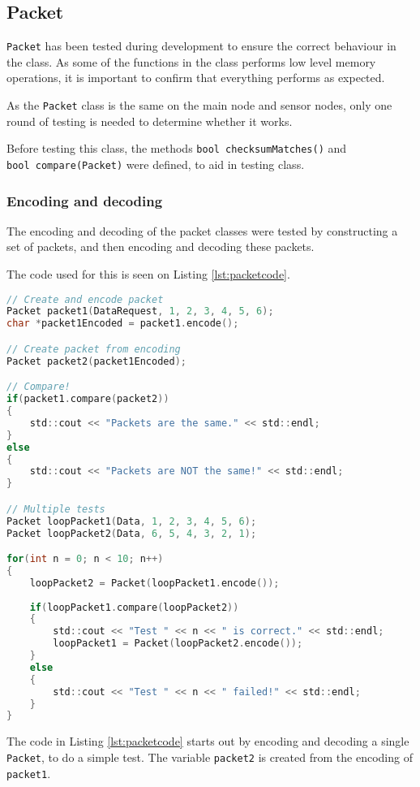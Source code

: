 \subsection{Packet}
\texttt{Packet} has been tested during development to ensure the correct behaviour in the class. As some of the functions in the class performs low level memory operations, it is important to confirm that everything performs as expected.

As the \texttt{Packet} class is the same on the main node and sensor nodes, only one round of testing is needed to determine whether it works.

Before testing this class, the methods \texttt{bool checksumMatches()} and \\ \texttt{bool compare(Packet)} were defined, to aid in testing class.

\subsubsection*{Encoding and decoding}
The encoding and decoding of the packet classes were tested by constructing a set of packets, and then encoding and decoding these packets.


The code used for this is seen on Listing \ref{lst:packetcode}.

\begin{lstlisting}[language=C,label={lst:packetcode},caption={Testing packet encoding/decoding.}]
// Create and encode packet
Packet packet1(DataRequest, 1, 2, 3, 4, 5, 6);
char *packet1Encoded = packet1.encode();

// Create packet from encoding
Packet packet2(packet1Encoded);

// Compare!
if(packet1.compare(packet2))
{
    std::cout << "Packets are the same." << std::endl;
}
else
{
    std::cout << "Packets are NOT the same!" << std::endl;
}

// Multiple tests
Packet loopPacket1(Data, 1, 2, 3, 4, 5, 6);
Packet loopPacket2(Data, 6, 5, 4, 3, 2, 1);

for(int n = 0; n < 10; n++)
{
    loopPacket2 = Packet(loopPacket1.encode());
    
    if(loopPacket1.compare(loopPacket2))
    {
        std::cout << "Test " << n << " is correct." << std::endl;
        loopPacket1 = Packet(loopPacket2.encode());
    }
    else
    {
        std::cout << "Test " << n << " failed!" << std::endl;
    }
}
\end{lstlisting}
The code in Listing \ref{lst:packetcode} starts out by encoding and decoding a single \texttt{Packet}, to do a simple test. The variable \texttt{packet2} is created from the encoding of \texttt{packet1}. 


